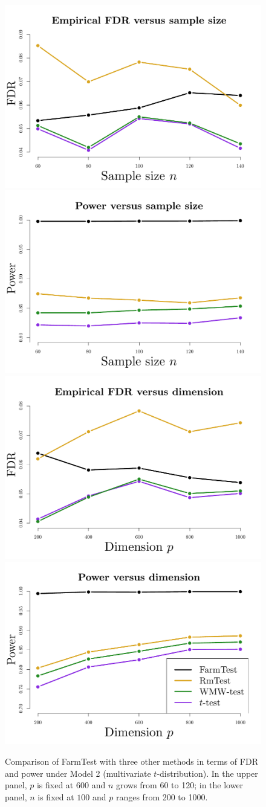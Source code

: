 \begin{figure}[!t]
\centering
                \includegraphics[width=.45\textwidth ]{figures/FDP_T_fixp.pdf}
                \includegraphics[width=.45\textwidth ]{figures/Power_T_fixp.pdf} \\
                \includegraphics[width=.45\textwidth ]{figures/FDP_T_fixn.pdf}
                \includegraphics[width=.45\textwidth ]{figures/Power_T_fixn.pdf}
                \caption {Comparison of {FarmTest} with three other methods in terms of FDR and power under  Model 2 (multivariate $t$-distribution). In the upper panel, $p$ is fixed at $600$ and $n$ grows from 60 to 120; in the lower panel, $n$ is fixed at $100$ and  $p$ ranges from 200 to 1000.}
                \label{fig:T}
\end{figure}


